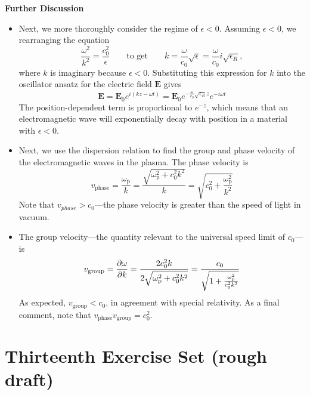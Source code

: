 \documentclass[11pt, a4paper]{article}
\newcommand{\eqtext}[1]{\qquad \text{#1} \qquad}
\renewcommand{\vec}[1]{\bm{#1}} %
\newcommand{\E}{\vec{E}}  %
\newcommand{\e}{\epsilon}
\begin{document}
\textbf{Further Discussion}	
\begin{itemize}
	
	\item Next, we more thoroughly consider the regime of $ \e < 0 $. Assuming $ \e < 0 $, we rearranging the equation 
	\begin{equation*}
		\frac{\omega^{2}}{k^{2}} = \frac{c_{0}^{2}}{\e} \eqtext{to get} k = \frac{\omega}{c_{0}}\sqrt{\e}  = \frac{\omega}{c_{0}}i \sqrt{\e_{R}},
	\end{equation*}
	where $ k $ is imaginary because $ \e < 0 $. Substituting this expression for $ k $ into the oscillator ansatz for the electric field $ \E $ gives
	\begin{equation*}
		\E = \E_{0} e^{i(kz - \omega t)} = \E_{0}e^{-\frac{\omega}{c_{0}}\sqrt{\e_{R}}z}e^{-i\omega t}
	\end{equation*}
	The position-dependent term is proportional to $ e^{-z} $, which means that an electromagnetic wave will exponentially decay with position in a material with $ \e < 0 $. 
	
	\item Next, we use the dispersion relation to find the group and phase velocity of the electromagnetic waves in the plasma. The phase velocity is 
	\begin{equation*}
		v_{\text{phase}} = \frac{\omega_{\mathrm{p}}}{k} = \frac{\sqrt{\omega_{\mathrm{p}}^{2} + c_{0}^{2}k^{2}}}{k} = \sqrt{c_{0}^{2} + \frac{\omega_{\mathrm{p}}^{2}}{k^{2}}}
	\end{equation*}
	Note that $ v_{phase} > c_{0} $---the phase velocity is greater than the speed of light in vacuum. 
	
	\item The group velocity---the quantity relevant to the universal speed limit of $ c_{0} $---is 
	\begin{equation*}
		v_{\mathrm{group}} = \pdv{\omega}{k} = \frac{2 c_{0}^{2}k}{2 \sqrt{\omega_{\mathrm{p}}^{2} + c_{0}^{2}k^{2}}} = \frac{c_{0}}{\sqrt{1 + \frac{\omega_{\mathrm{p}}^{2}}{c_{0}^{2}k^{2}}}}
	\end{equation*}
	As expected, $ v_{\mathrm{group}} < c_{0} $, in agreement with special relativity. As a final comment, note that $ v_{\mathrm{phase}}v_{\mathrm{group}} = c_{0}^{2} $.
\end{itemize}

\section{Thirteenth Exercise Set (rough draft)}
\end{document}
